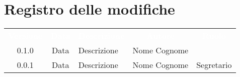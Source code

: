 \section*{Registro delle modifiche}
{
\renewcommand{\arraystretch}{1.5}
\centering
\begin{longtable}{ c c  C{4cm}  c  c }
\textcolor{white}{\textbf{Versione}} & \textcolor{white}{\textbf{Data}} & \textcolor{white}{\textbf{Descrizione}} & \textcolor{white}{\textbf{Autore}} & \textcolor{white}{\textbf{Ruolo}}\\	
		
0.1.0 & Data & Descrizione & Nome Cognome &  \\
		
0.0.1 & Data & Descrizione & Nome Cognome &  Segretario\\
		
\end{longtable}
}